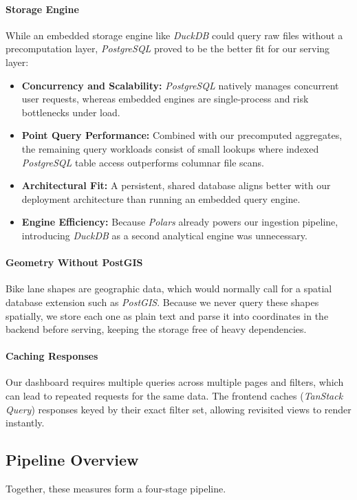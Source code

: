 \paragraph{Storage Engine}
While an embedded storage engine like \emph{DuckDB} could query raw files without a precomputation layer, \emph{PostgreSQL} proved to be the better fit for our serving layer:
\begin{itemize}
    \item \textbf{Concurrency and Scalability:} \emph{PostgreSQL} natively manages concurrent user requests, whereas embedded engines are single-process and risk bottlenecks under load.
    \item \textbf{Point Query Performance:} Combined with our precomputed aggregates, the remaining query workloads consist of small lookups where indexed \emph{PostgreSQL} table access outperforms columnar file scans.
    \item \textbf{Architectural Fit:} A persistent, shared database aligns better with our deployment architecture than running an embedded query engine.
    \item \textbf{Engine Efficiency:} Because \emph{Polars} already powers our ingestion pipeline, introducing \emph{DuckDB} as a second analytical engine was unnecessary.
\end{itemize}

\paragraph{Geometry Without PostGIS}
Bike lane shapes are geographic data, which would normally call for a spatial database extension such as \emph{PostGIS}.
Because we never query these shapes spatially, we store each one as plain text and parse it into coordinates in the backend before serving, keeping the storage free of heavy dependencies.

\paragraph{Caching Responses}
Our dashboard requires multiple queries across multiple pages and filters, which can lead to repeated requests for the same data.
The frontend caches (\emph{TanStack Query}) responses keyed by their exact filter set, allowing revisited views to render instantly.

\subsection{Pipeline Overview}
Together, these measures form a four-stage pipeline.

